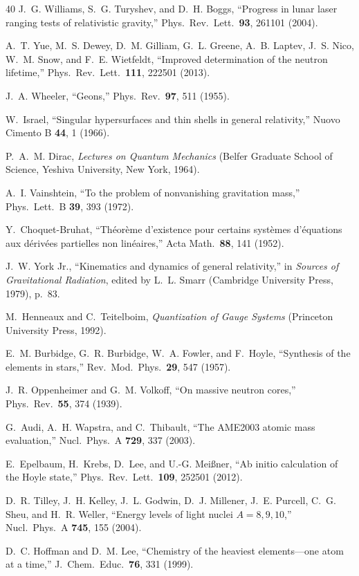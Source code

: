 \documentclass[aps,prd,preprint,superscriptaddress,showpacs,preprintnumbers,amsmath,amssymb,nofootinbib]{revtex4-2}
\begin{document}
\begin{thebibliography}{40}
J.~G. Williams, S.~G. Turyshev, and D.~H. Boggs, ``Progress in lunar laser ranging tests of relativistic gravity,'' Phys.\ Rev.\ Lett.\ \textbf{93}, 261101 (2004).

A.~T. Yue, M.~S. Dewey, D.~M. Gilliam, G.~L. Greene, A.~B. Laptev, J.~S. Nico, W.~M. Snow, and F.~E. Wietfeldt, ``Improved determination of the neutron lifetime,'' Phys.\ Rev.\ Lett.\ \textbf{111}, 222501 (2013).

J.~A. Wheeler, ``Geons,'' Phys.\ Rev.\ \textbf{97}, 511 (1955).

W.~Israel, ``Singular hypersurfaces and thin shells in general relativity,'' Nuovo Cimento B \textbf{44}, 1 (1966).

P.~A.~M. Dirac, \emph{Lectures on Quantum Mechanics} (Belfer Graduate School of Science, Yeshiva University, New York, 1964).

A.~I. Vainshtein, ``To the problem of nonvanishing gravitation mass,'' Phys.\ Lett.\ B \textbf{39}, 393 (1972).

Y.~Choquet-Bruhat, ``Th\'eor\`eme d'existence pour certains syst\`emes d'\'equations aux d\'eriv\'ees partielles non lin\'eaires,'' Acta Math.\ \textbf{88}, 141 (1952).

J.~W. York Jr., ``Kinematics and dynamics of general relativity,'' in \emph{Sources of Gravitational Radiation}, edited by L.~L. Smarr (Cambridge University Press, 1979), p.~83.

M.~Henneaux and C.~Teitelboim, \emph{Quantization of Gauge Systems} (Princeton University Press, 1992).

E.~M. Burbidge, G.~R. Burbidge, W.~A. Fowler, and F.~Hoyle, ``Synthesis of the elements in stars,'' Rev.\ Mod.\ Phys.\ \textbf{29}, 547 (1957).

J.~R. Oppenheimer and G.~M. Volkoff, ``On massive neutron cores,'' Phys.\ Rev.\ \textbf{55}, 374 (1939).

G.~Audi, A.~H. Wapstra, and C.~Thibault, ``The AME2003 atomic mass evaluation,'' Nucl.\ Phys.\ A \textbf{729}, 337 (2003).

E.~Epelbaum, H.~Krebs, D.~Lee, and U.-G. Mei{\ss}ner, ``Ab initio calculation of the Hoyle state,'' Phys.\ Rev.\ Lett.\ \textbf{109}, 252501 (2012).

D.~R. Tilley, J.~H. Kelley, J.~L. Godwin, D.~J. Millener, J.~E. Purcell, C.~G. Sheu, and H.~R. Weller, ``Energy levels of light nuclei $A = 8, 9, 10$,'' Nucl.\ Phys.\ A \textbf{745}, 155 (2004).

D.~C. Hoffman and D.~M. Lee, ``Chemistry of the heaviest elements---one atom at a time,'' J.\ Chem.\ Educ.\ \textbf{76}, 331 (1999).

\end{thebibliography}
\end{document}
